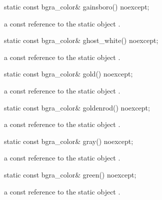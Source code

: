 \begin{itemdecl}
static const bgra_color& gainsboro() noexcept;
\end{itemdecl}
\begin{itemdescr}
\pnum
\returns
a const reference to the static  object .
\end{itemdescr}

\begin{itemdecl}
static const bgra_color& ghost_white() noexcept;
\end{itemdecl}
\begin{itemdescr}
\pnum
\returns
a const reference to the static  object .
\end{itemdescr}

\begin{itemdecl}
static const bgra_color& gold() noexcept;
\end{itemdecl}
\begin{itemdescr}
\pnum
\returns
a const reference to the static  object .
\end{itemdescr}

\begin{itemdecl}
static const bgra_color& goldenrod() noexcept;
\end{itemdecl}
\begin{itemdescr}
\pnum
\returns
a const reference to the static  object .
\end{itemdescr}

\begin{itemdecl}
static const bgra_color& gray() noexcept;
\end{itemdecl}
\begin{itemdescr}
\pnum
\returns
a const reference to the static  object .
\end{itemdescr}

\begin{itemdecl}
static const bgra_color& green() noexcept;
\end{itemdecl}
\begin{itemdescr}
\pnum
\returns
a const reference to the static  object .
\end{itemdescr}


